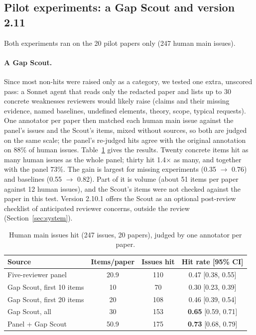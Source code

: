 \documentclass[11pt,a4paper]{article}
\begin{document}
\subsection{Pilot experiments: a Gap Scout and version 2.11}\label{sec:p4}
Both experiments ran on the 20 pilot papers only (247 human main issues).

\paragraph{A Gap Scout.} Since most non-hits were raised only as a
category, we tested one extra, unscored pass: a Sonnet agent that reads only the redacted paper
and lists up to 30 concrete weaknesses reviewers would likely raise (claims and their missing
evidence, named baselines, undefined elements, theory, scope, typical requests). One annotator
per paper then matched each human main issue against the panel's issues and the Scout's items,
mixed without sources, so both are judged on the same scale; the panel's re-judged hits agree
with the original annotation on 88\% of human issues. Table~\ref{tab:gap} gives the results.
Twenty concrete items hit as many human issues as the whole panel; thirty hit 1.4$\times$ as
many, and together with the panel 73\%. The gain is largest for missing experiments (0.35
$\to$ 0.76) and baselines (0.55 $\to$ 0.82). Part of it is volume (about 51 items per paper
against 12 human issues), and the Scout's items were not checked against the paper in this
test. Version 2.10.1 offers the Scout as an optional post-review checklist of anticipated
reviewer concerns, outside the review (Section~\ref{sec:system}).

\begin{table}[h]
\centering
\small
\caption{Human main issues hit (247 issues, 20 papers), judged by one annotator per paper.}\label{tab:gap}
\begin{tabular}{lccc}
\toprule
Source & Items/paper & Issues hit & Hit rate [95\% CI]\\
\midrule
Five-reviewer panel & 20.9 & 110 & 0.47 [0.38, 0.55]\\
Gap Scout, first 10 items & 10 & 70 & 0.30 [0.23, 0.39]\\
Gap Scout, first 20 items & 20 & 108 & 0.46 [0.39, 0.54]\\
Gap Scout, all & 30 & 153 & \textbf{0.65} [0.59, 0.71]\\
Panel + Gap Scout & 50.9 & 175 & \textbf{0.73} [0.68, 0.79]\\
\bottomrule
\end{tabular}
\end{table}
\end{document}
